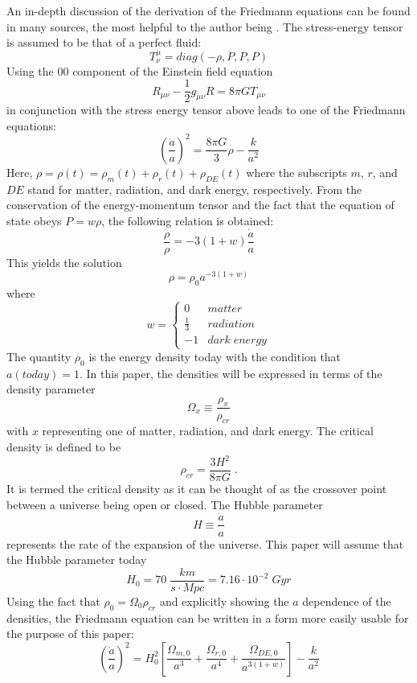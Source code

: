 \documentclass[aps,reprint,prl,floatfix,nofootinbib]{revtex4-1}
\begin{document}
An in-depth discussion of the derivation of the Friedmann equations can be found in many sources, the most helpful to the author being \cite{carroll}.  The stress-energy tensor is assumed to be that of a perfect fluid:
$$T^{\mu}_{\nu}=diag(-\rho,P,P,P)$$
Using the $00$ component of the Einstein field equation
$$R_{\mu\nu}-\frac{1}{2}g_{\mu\nu}R=8\pi GT_{\mu\nu} $$
in conjunction with the stress energy tensor above leads to one of the Friedmann equations:
\begin{equation}
\left(\frac{\dot{a}}{a}\right)^2=\frac{8\pi G}{3}\rho-\frac{k}{a^2}
\end{equation}
Here, $\rho=\rho(t)=\rho_{m}(t)+\rho_{r}(t)+\rho_{DE}(t)$
where the subscripts $m$, $r$, and $DE$ stand for matter, radiation, and dark energy, respectively.  From the conservation of the energy-momentum tensor and the fact that the equation of state obeys $P=w\rho$, the following relation is obtained:
$$\frac{ \dot{\rho} }{\rho}=-3(1+w)\frac{ \dot{a} }{a}$$
This yields the solution
\begin{equation}
\rho=\rho_0a^{-3(1+w)}
\end{equation}
where
\[w = \left\{
  \begin{array}{lr}
    0 & matter\\
    \frac{1}{3} & radiation\\
    -1 & dark\;energy
  \end{array}
\right.
\]
The quantity $\rho_0$ is the energy density today with the condition that $a(today)=1$.  In this paper, the densities will be expressed in terms of the density parameter 
$$\Omega_x \equiv \frac{ \rho_{x} }{\rho_{cr}}$$
with $x$ representing one of matter, radiation, and dark energy.  The critical density is defined to be
$$\rho_{cr}=\frac{3H^2}{8\pi G}\;.$$
It is termed the critical density as it can be thought of as the crossover point between a universe being open or closed.  The Hubble parameter
\begin{equation} \label{eq:hubble}
H\equiv \frac{ \dot{a} }{a}
\end{equation}
represents the rate of the expansion of the universe.  This paper will assume that the Hubble parameter today
$$H_0=70\;\frac{km}{s\cdot Mpc}=7.16\cdot10^{-2}\;Gyr$$
Using the fact that $\rho_0=\Omega_0 \rho_{cr}$ and explicitly showing the $a$ dependence of the densities, the Friedmann equation can be written in a form more easily usable for the purpose of this paper:
\begin{equation} \label{eq:friedmann}
\left(\frac{\dot{a}}{a}\right)^2=H_0^2\left[ \frac{\Omega_{m,0}}{a^3}+\frac{\Omega_{r,0}}{a^4}+\frac{\Omega_{DE,0}}{a^{3(1+w)}} \right] -\frac{k}{a^2}
\end{equation}
\end{document}
